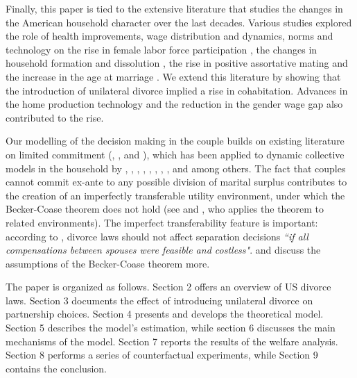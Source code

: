 \documentclass[12pt]{article}
\numberwithin{table}{section}
\begin{document}
Finally, this paper is tied to the extensive literature that studies the changes in the American household character over the last decades. Various studies explored the role of health improvements, wage distribution and dynamics, norms and technology on the rise in female labor force participation \citep{fernandez2004,greenwood2005,albanesi2016,greenwood2016}, the changes in household formation and dissolution \citep{greenwood2016,ciscato2019}, the rise in positive assortative mating \citep{fernandez2005,greenwood2016,ciscato2019} and the increase in the age at marriage \citep{santos2016}. We extend this literature by showing that the introduction of unilateral divorce implied a rise in cohabitation. Advances in the home production technology and the reduction in the gender wage gap also contributed to the rise.

Our modelling of the decision making in the couple builds on existing literature on limited commitment (\cite{kk1996},  \cite{ligon2002}, \cite{marcet2019} and \cite{pavoni2018}), which has been applied to dynamic collective models in the household by \cite{mazzocco2007}, \cite{mazzocco2013}, \cite{bayot2015}, \cite{rigas2015}, \cite{voena2015}, \cite{abraham2018}, \cite{lise2018}, \cite{low2018}, \cite{foerster2019} and \cite{reynoso2019} among others. The fact that couples cannot commit ex-ante to any possible division of marital surplus contributes to the creation of an imperfectly transferable utility environment, under which the Becker-Coase theorem does not hold (see \cite{galichon2019} and \cite{weber2018}, who applies the theorem to related environments). The imperfect transferability feature is important: according to \cite{becker1977}, divorce laws should not affect separation decisions \textit{``if all compensations between spouses were feasible and costless"}. \cite{chiappori2015} and \cite{fella2004} discuss the assumptions of the Becker-Coase theorem more.


The paper is organized as follows. Section 2 offers an overview of US divorce laws. Section 3 documents the effect of introducing unilateral divorce on partnership choices. Section 4 presents and develops the theoretical model. Section 5 describes the model's estimation, while section 6 discusses the main mechanisms of the model. Section 7 reports the results of the welfare analysis. Section 8 performs a series of counterfactual experiments, while Section 9 contains the conclusion.
\end{document}
